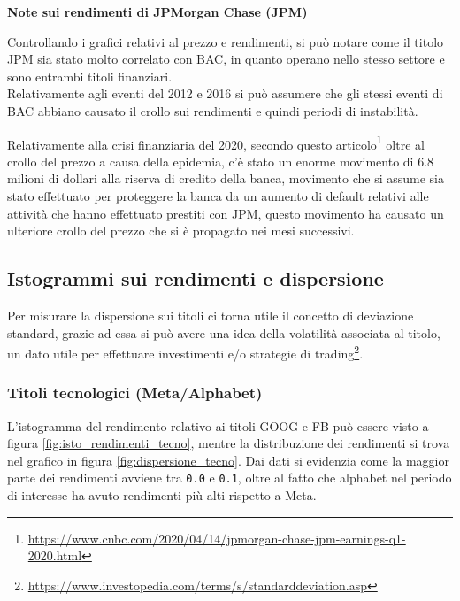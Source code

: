 \textbf{Note sui rendimenti di JPMorgan Chase (JPM)}

Controllando i grafici relativi al prezzo e rendimenti, si può notare come il titolo JPM sia stato molto correlato con BAC, in quanto operano nello stesso settore e sono entrambi
titoli finanziari.\\
Relativamente agli eventi del 2012 e 2016 si può assumere che gli stessi eventi di BAC abbiano causato il crollo sui rendimenti e quindi periodi di instabilità.

Relativamente alla crisi finanziaria del 2020, secondo questo
articolo\footnote{
  \href{https://www.cnbc.com/2020/04/14/jpmorgan-chase-jpm-earnings-q1-2020.html}{https://www.cnbc.com/2020/04/14/jpmorgan-chase-jpm-earnings-q1-2020.html}
}
oltre al crollo del prezzo a causa della epidemia, c'è stato un enorme movimento di 6.8 milioni di dollari alla riserva di credito della banca, movimento che si assume sia stato effettuato
per proteggere la banca da un aumento di default relativi alle attività che hanno effettuato prestiti con JPM, questo movimento ha causato un ulteriore crollo del prezzo che si è propagato nei mesi successivi.

\pagebreak

\subsection{Istogrammi sui rendimenti e dispersione}

Per misurare la dispersione sui titoli ci torna utile il concetto di deviazione standard, grazie ad essa si può avere una idea della
 volatilità associata al titolo, un dato utile per effettuare investimenti e/o strategie di 
trading\footnote{
  \href{https://www.investopedia.com/terms/s/standarddeviation.asp}{https://www.investopedia.com/terms/s/standarddeviation.asp}
}.\\

\subsubsection{Titoli tecnologici (Meta/Alphabet)}

L'istogramma del rendimento relativo ai titoli GOOG e FB può essere visto a figura \ref{fig:isto_rendimenti_tecno}, mentre la distribuzione dei 
rendimenti si trova nel grafico in figura \ref{fig:dispersione_tecno}.
Dai dati si evidenzia come la maggior parte dei rendimenti avviene tra \verb|0.0| e \verb|0.1|, oltre al fatto che alphabet nel periodo di interesse ha avuto rendimenti più alti
rispetto a Meta.

